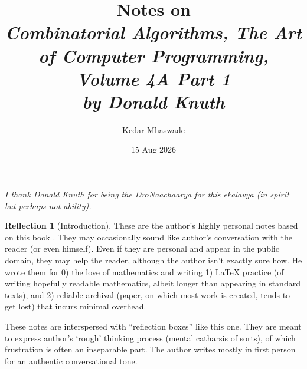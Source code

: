 \documentclass[11pt]{book}
\title{Notes on \\ \emph{Combinatorial Algorithms, The Art of Computer Programming, Volume 4A Part 1}
\\ \emph{by Donald Knuth \cite{taocp-v4a-p1}}
\\ }
\author{Kedar Mhaswade}
\date{15 Aug 2026}
\theoremstyle{definition}
\theoremstyle{plain}
\theoremstyle{problemstyle}
\theoremstyle{remark}
\theoremstyle{definition}
\newtheorem{reflection}{Reflection}
\begin{document}
\maketitle
\cleardoublepage
\chapter*{}
\thispagestyle{empty} %

\vspace*{\fill} %

\begin{center}
    \textit{I thank Donald Knuth for being the DroNaachaarya for this ekalavya (in spirit but perhaps not ability).}
\end{center}

\vspace*{\fill} %
\cleardoublepage

\begin{reflection}[Introduction]
    These are the author's highly personal notes based on this book \cite{taocp-v4a-p1}. They may occasionally sound like author's conversation with the reader (or even himself). Even if they are personal and appear in the public domain, they may help the reader, although the author isn't exactly sure how. He wrote them for 0) the love of mathematics and writing 1) \LaTeX{} practice (of writing hopefully readable mathematics, albeit longer than appearing in standard texts), and 2) reliable archival (paper, on which most work is created, tends to get lost) that incurs minimal overhead.

    These notes are interspersed with ``reflection boxes'' like this one. They are meant to express author's `rough' thinking process (mental catharsis of sorts), of which frustration is often an inseparable part. The author writes mostly in first person for an authentic conversational tone.

\end{reflection}
\end{document}
